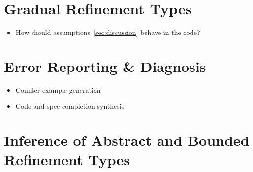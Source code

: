\section{Gradual Refinement Types}\label{future:gradua}
\begin{itemize}
\item How should assumptions~\ref{sec:discussion} behave in the code? 
\end{itemize}


\section{Error Reporting \& Diagnosis}\label{future:errorreporting}
\begin{itemize}
\item Counter example generation 
\item Code and spec completion synthesis
\end{itemize}

\section{Inference of Abstract and Bounded Refinement Types}